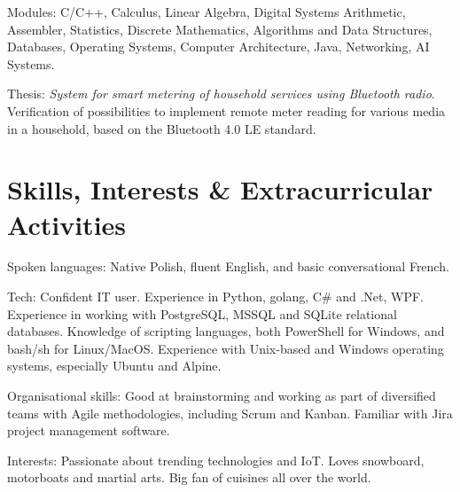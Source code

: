 \documentclass[12pt,english]{resume}
\begin{document}
			Modules: C/C++, Calculus, Linear Algebra, Digital Systems Arithmetic, Assembler, Statistics, Discrete Mathematics, Algorithms and Data Structures, Databases, Operating Systems, Computer Architecture, Java, Networking, AI Systems.

			\noindent
			Thesis: \emph{System for smart metering of household services using Bluetooth radio}.
			Verification of possibilities to implement remote meter reading for various media in a household, based on the Bluetooth 4.0 LE standard.

	\section{Skills, Interests \& Extracurricular Activities}
		Spoken languages: Native Polish, fluent English, and basic conversational French.

		\noindent
		Tech: Confident IT user. Experience in Python, golang, C\# and .Net, WPF. Experience in working with PostgreSQL, MSSQL and SQLite relational databases. Knowledge of scripting languages, both PowerShell for Windows, and bash/sh for Linux/MacOS. Experience with Unix-based and Windows operating systems, especially Ubuntu and Alpine.

		\noindent
		Organisational skills: Good at brainstorming and working as part of diversified teams with Agile methodologies, including Scrum and Kanban. Familiar with Jira project management software.

		\noindent
		Interests: Passionate about trending technologies and IoT. Loves snowboard, motorboats and martial arts. Big fan of cuisines all over the world.
\end{document}
